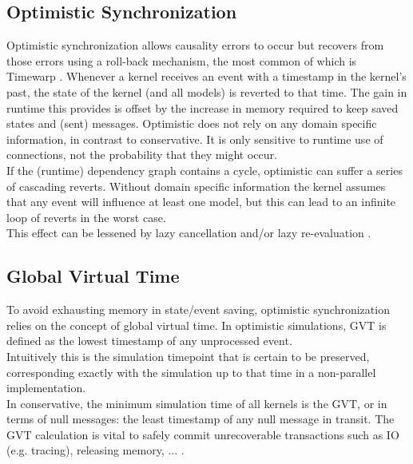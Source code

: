 \subsection{Optimistic Synchronization}
Optimistic synchronization allows causality errors to occur but recovers from those errors using a roll-back mechanism, the most common of which is Timewarp \cite{Jefferson:1985:VT:3916.3988}.
Whenever a kernel receives an event with a timestamp in the kernel's past, the state of the kernel (and all models) is reverted to that time. The gain in runtime this provides is offset by the increase in memory required to keep saved states and (sent) messages.
Optimistic does not rely on any domain specific information, in contrast to conservative. It is only sensitive to runtime use of connections, not the probability that they might occur. %
\\
If the (runtime) dependency graph contains a cycle, optimistic can suffer a series of cascading reverts. Without domain specific information the kernel assumes that any event will influence at least one model, but this can lead to an infinite loop of reverts in the worst case.\\
This effect can be lessened by lazy cancellation and/or lazy re-evaluation \cite{FujimotoBook}.
\subsection{Global Virtual Time}
To avoid exhausting memory in state/event saving, optimistic synchronization relies on the concept of global virtual time\cite{Jefferson:1985:VT:3916.3988}. In optimistic simulations, GVT is defined as the lowest timestamp of any unprocessed event. \\ Intuitively this is the simulation timepoint that is certain to be preserved, corresponding exactly with the simulation up to that time in a non-parallel implementation.\\
In conservative, the minimum simulation time of all kernels is the GVT, or in terms of null messages: the least timestamp of any null message in transit.
The GVT calculation is vital to safely commit unrecoverable transactions such as IO (e.g. tracing), releasing memory, ... .

